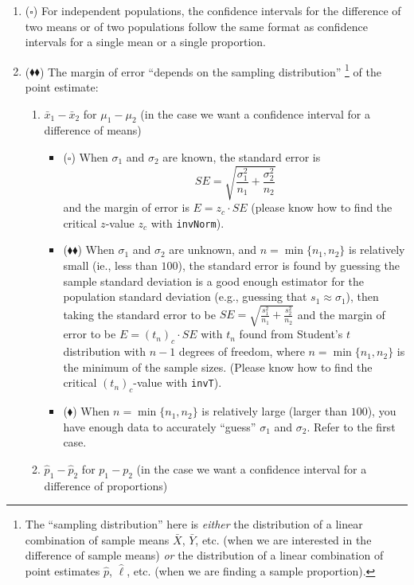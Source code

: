 \documentclass[11pt]{article}
\newcommand{\bs}{$\square$}
\newcommand{\bd}{$\blacklozenge$}
\newcommand{\dbd}{$\blacklozenge\blacklozenge$}
\begin{document}
\begin{enumerate}[resume]

\item (\bs) For independent populations, the confidence intervals for the difference of two means or of two populations follow the same format as confidence intervals for a single mean or a single proportion.

\newpage
\item (\dbd) The margin of error ``depends on the sampling distribution''%
    \footnote{%
    The ``sampling distribution'' here is \emph{either} the distribution of a linear combination of sample means $\bar{X}$, $\bar{Y}$, etc. (when we are interested in the difference of sample means) \emph{or} the distribution of a linear combination of point estimates $\hat{p}$, $\hat{\ell}$, etc. (when we are finding a sample proportion).
    }
of the point estimate:
\begin{enumerate}
    \item $\bar{x}_1 - \bar{x}_2$ for $\mu_1 - \mu_2$  (in the case we want a confidence interval for a difference of means)
    \begin{itemize}
        \item (\bs) When $\sigma_1$ and $\sigma_2$ are known, the standard error is \[SE = \sqrt{\frac{\sigma_1^2}{n_1} +\frac{\sigma_2^2}{n_2}}\] and the margin of error is $E = z_c \cdot SE$ (please know how to find the critical $z$-value $z_c$ with \texttt{invNorm}).
        \item (\dbd) When $\sigma_1$ and $\sigma_2$ are unknown, and $n = \min\{n_1, n_2\}$ is relatively small (ie., less than $100$), the standard error is found by guessing the sample standard deviation is a good enough estimator for the population standard deviation (e.g., guessing that $s_1 \approx \sigma_1$), then taking the standard error to be $SE = \sqrt{\frac{s_1^2}{n_1} +\frac{s_2^2}{n_2}}$ and the margin of error to be $E = (t_n)_c \cdot SE$ with $t_n$ found from Student's $t$ distribution with $n - 1$ degrees of freedom, where $n =\min\{n_1, n_2\}$ is the minimum of the sample sizes. (Please know how to find the critical $(t_n)_c$-value with \texttt{invT}).
    \item (\bd) When $n = \min\{n_1, n_2\}$ is relatively large (larger than $100$), you have enough data to accurately ``guess'' $\sigma_1$ and $\sigma_2$. Refer to the first case.
    \end{itemize}
    \item $\hat{p}_1 - \hat{p}_2$ for $p_1 - p_2$ (in the case we want a confidence interval for a difference of proportions)

\end{enumerate}
\end{enumerate}
\end{document}
